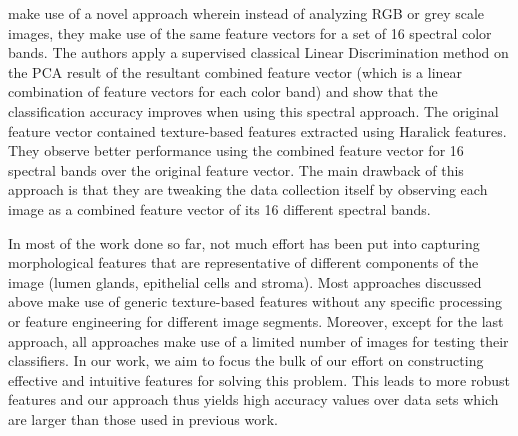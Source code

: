 \cite{roula2002multispectral} make use of a novel approach wherein instead of analyzing RGB or grey scale images, they make use of the same feature vectors for a set of 16 spectral color bands. The authors apply a supervised classical Linear Discrimination method on the PCA result of the resultant combined feature vector (which is a linear combination of feature vectors for each color band) and show that the classification accuracy improves when using this spectral approach. The original feature vector contained texture-based features extracted using Haralick features. They observe better performance using the combined feature vector for 16 spectral bands over the original feature vector. The main drawback of this approach is that they are tweaking the data collection itself by observing each image as a combined feature vector of its 16 different spectral bands.

In most of the work done so far, not much effort has been put into capturing morphological features that are representative of different components of the image (lumen glands, epithelial cells and stroma). Most approaches discussed above make use of generic texture-based features without any specific processing or feature engineering for different image segments. Moreover, except for the last approach, all approaches make use of a limited number of images for testing their classifiers. In our work, we aim to focus the bulk of our effort on constructing effective and intuitive features for solving this problem. This leads to more robust features and our approach thus yields high accuracy values over data sets which are larger than those used in previous work.
\label{sec:rel_work}